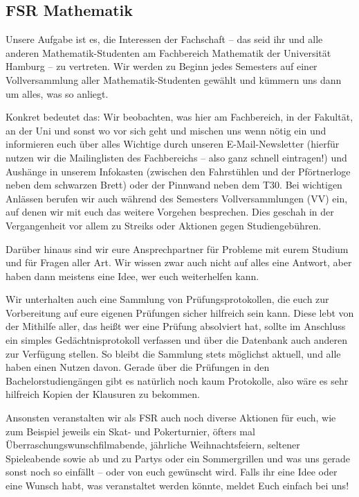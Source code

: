 \subsection{FSR Mathematik}

Unsere Aufgabe ist es, die Interessen der Fachschaft -- das seid ihr und alle
anderen Mathematik-Studenten am Fachbereich Mathematik der Universität Hamburg --
zu vertreten. Wir werden zu Beginn jedes Semesters auf einer Vollversammlung
aller Mathematik-Studenten gewählt und kümmern uns dann um alles, was so anliegt.

Konkret bedeutet das: Wir beobachten, was hier am Fachbereich, in der Fakultät,
an der Uni und sonst wo vor sich geht und mischen uns wenn nötig ein und
informieren euch über alles Wichtige durch unseren E-Mail-Newsletter (hierfür
nutzen wir die Mailinglisten des Fachbereichs -- also ganz schnell eintragen!)
und Aushänge in unserem Infokasten (zwischen den Fahrstühlen und der
Pförtnerloge neben dem schwarzen Brett) oder der Pinnwand neben
dem T30. Bei wichtigen Anlässen berufen wir auch während des Semesters
Vollversammlungen (VV) ein, auf denen wir mit euch das weitere Vorgehen
besprechen. Dies geschah in der Vergangenheit vor allem zu Streiks oder
Aktionen gegen Studiengebühren.

Darüber hinaus sind wir eure Ansprechpartner für Probleme mit eurem Studium und
für Fragen aller Art. Wir wissen zwar auch nicht auf alles eine Antwort, aber
haben dann meistens eine Idee, wer euch weiterhelfen kann.

Wir unterhalten auch eine Sammlung von Prüfungsprotokollen, die euch zur
Vorbereitung auf eure eigenen Prüfungen sicher hilfreich sein kann. Diese lebt
von der Mithilfe aller, das heißt wer eine Prüfung absolviert hat, sollte im
Anschluss ein simples Gedächtnisprotokoll verfassen und über die Datenbank auch
anderen zur Verfügung stellen. So bleibt die Sammlung stets möglichst aktuell,
und alle haben einen Nutzen davon. Gerade über die Prüfungen in den
Bachelorstudiengängen gibt es natürlich noch kaum Protokolle, also wäre es sehr
hilfreich Kopien der Klausuren zu bekommen.

Ansonsten veranstalten wir als FSR auch noch diverse Aktionen für euch, wie zum
Beispiel jeweils ein Skat- und Pokerturnier, öfters mal
Überraschungswunschfilmabende, jährliche Weihnachtsfeiern, seltener
Spieleabende sowie ab und zu Partys oder ein Sommergrillen und was uns gerade
sonst noch so einfällt -- oder von euch gewünscht wird. Falls ihr eine Idee
oder eine Wunsch habt, was veranstaltet werden könnte, meldet Euch einfach bei
uns!

